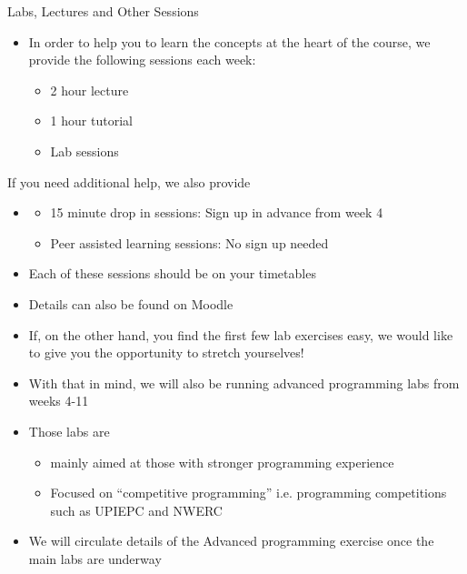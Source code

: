 \documentclass{beamer}
\begin{document}
 \begin{frame}

Labs, Lectures and Other Sessions

\begin{itemize}
\item In order to help you to learn the concepts at the heart of the course, we provide the following sessions each
week:

\begin{itemize}
\item 2 hour lecture
\item 1 hour tutorial
\item Lab sessions

\end{itemize}
\end{itemize}
\end{frame} 

\begin{frame}

If you need additional help, we also provide

\begin{itemize}
\item \begin{itemize}
\item 15 minute drop in sessions: Sign up in advance from week 4
\item Peer assisted learning sessions: No sign up needed
\end{itemize}
\item Each of these sessions should be on your timetables
\item Details can also be found on Moodle
\end{itemize}
\end{frame} \begin{frame}

\begin{itemize}
\item If, on the other hand, you find the first few lab exercises easy, we would like to give you the opportunity to
stretch yourselves!
\item With that in mind, we will also be running advanced programming labs from weeks 4-11
\item Those labs are

\begin{itemize}
\item mainly aimed at those with stronger programming experience
\item Focused on ``competitive programming'' i.e. programming competitions such as UPIEPC and NWERC

\end{itemize}
\item We will circulate details of the Advanced programming exercise once the main labs are underway
\end{itemize}
\end{frame} 
\end{document}

